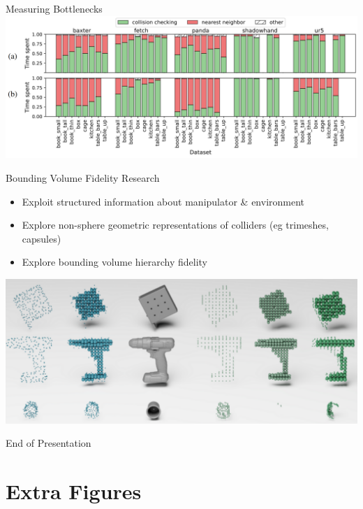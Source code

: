 \documentclass{beamer}
\newcommand{\todo}[1]{\textit{\textcolor{red}{#1}}}
\begin{document}
\begin{frame}{Measuring Bottlenecks}
\includegraphics[width=\textwidth]{./assets/cc_nn_zoom.png}
\end{frame}

\begin{frame}{Bounding Volume Fidelity Research}
\begin{itemize}
\item Exploit structured information about manipulator \& environment
\item Explore non-sphere geometric representations of colliders (eg trimeshes, capsules)
\item Explore bounding volume hierarchy fidelity
\end{itemize}
\centering
\includegraphics[height=0.37\textheight]{./assets/geom_fidelity.png}
\end{frame}

%

\begin{frame}{End of Presentation}
\end{frame}

\section{Extra Figures}
\end{document}

